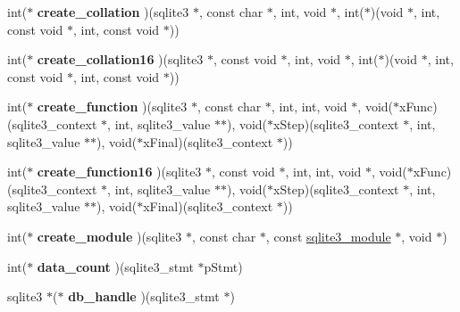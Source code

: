 \begin{DoxyCompactItemize}
int($\ast$ {\bfseries create\+\_\+collation} )(sqlite3 $\ast$, const char $\ast$, int, void $\ast$, int($\ast$)(void $\ast$, int, const void $\ast$, int, const void $\ast$))
\item 
\mbox{\label{structsqlite3__api__routines_a2f05772713bb942bff670352a96ee1e6}} 
int($\ast$ {\bfseries create\+\_\+collation16} )(sqlite3 $\ast$, const void $\ast$, int, void $\ast$, int($\ast$)(void $\ast$, int, const void $\ast$, int, const void $\ast$))
\item 
\mbox{\label{structsqlite3__api__routines_aaf30781efad4fb70111f391e6fe20a9c}} 
int($\ast$ {\bfseries create\+\_\+function} )(sqlite3 $\ast$, const char $\ast$, int, int, void $\ast$, void($\ast$x\+Func)(sqlite3\+\_\+context $\ast$, int, sqlite3\+\_\+value $\ast$$\ast$), void($\ast$x\+Step)(sqlite3\+\_\+context $\ast$, int, sqlite3\+\_\+value $\ast$$\ast$), void($\ast$x\+Final)(sqlite3\+\_\+context $\ast$))
\item 
\mbox{\label{structsqlite3__api__routines_a0c3f05b118b89293ff5d35774504b44d}} 
int($\ast$ {\bfseries create\+\_\+function16} )(sqlite3 $\ast$, const void $\ast$, int, int, void $\ast$, void($\ast$x\+Func)(sqlite3\+\_\+context $\ast$, int, sqlite3\+\_\+value $\ast$$\ast$), void($\ast$x\+Step)(sqlite3\+\_\+context $\ast$, int, sqlite3\+\_\+value $\ast$$\ast$), void($\ast$x\+Final)(sqlite3\+\_\+context $\ast$))
\item 
\mbox{\label{structsqlite3__api__routines_a25834b37191417562ecd2ee67b85617b}} 
int($\ast$ {\bfseries create\+\_\+module} )(sqlite3 $\ast$, const char $\ast$, const \hyperlink{structsqlite3__module}{sqlite3\+\_\+module} $\ast$, void $\ast$)
\item 
\mbox{\label{structsqlite3__api__routines_aea0a7b7483770202ef9eae88b4eb70cd}} 
int($\ast$ {\bfseries data\+\_\+count} )(sqlite3\+\_\+stmt $\ast$p\+Stmt)
\item 
\mbox{\label{structsqlite3__api__routines_ab0133d05f54efba67f6172538ca25ae0}} 
sqlite3 $\ast$($\ast$ {\bfseries db\+\_\+handle} )(sqlite3\+\_\+stmt $\ast$)
\item 
\mbox{\label{structsqlite3__api__routines_a6b6035b36ea9d0800181e69e20059b32}} 

\end{DoxyCompactItemize}
